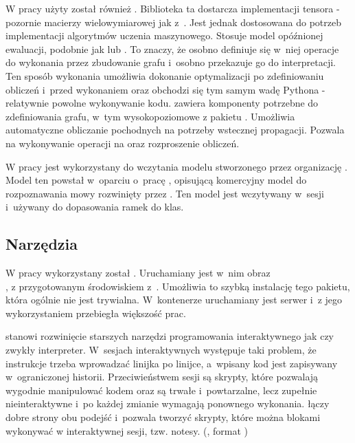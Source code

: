 W pracy użyty został również . Biblioteka ta dostarcza
implementacji tensora - pozornie macierzy wielowymiarowej jak z~. Jest jednak
dostosowana do potrzeb implementacji algorytmów uczenia maszynowego. Stosuje model opóźnionej
ewaluacji, podobnie jak  lub . To znaczy, że
osobno definiuje się w~niej operacje do wykonania przez zbudowanie grafu i~osobno przekazuje go do interpretacji.
Ten sposób wykonania umożliwia dokonanie optymalizacji po zdefiniowaniu obliczeń i~przed wykonaniem oraz
obchodzi się tym samym wadę Pythona - relatywnie powolne wykonywanie kodu.
 zawiera komponenty potrzebne do zdefiniowania grafu, w~tym wysokopoziomowe
z pakietu . Umożliwia automatyczne obliczanie pochodnych na potrzeby wstecznej propagacji.
Pozwala na wykonywanie operacji na  oraz rozproszenie obliczeń.

W pracy  jest wykorzystany do wczytania modelu stworzonego przez organizację .
Model ten powstał w~oparciu o~pracę \cite{deepSpeechScaling},
opisującą komercyjny model do rozpoznawania mowy rozwinięty przez .
Ten model jest wczytywany w~sesji  i~używany do dopasowania ramek do klas.

\subsection{Narzędzia}

W pracy wykorzystany został . Uruchamiany jest w~nim obraz \\ ,
z przygotowanym środowiskiem z~. Umożliwia to szybką instalację tego pakietu, która ogólnie nie
jest trywialna. W~kontenerze uruchamiany jest serwer  i~z jego wykorzystaniem przebiegła większość prac.

 stanowi rozwinięcie starszych narzędzi programowania interaktywnego jak  czy zwykły  interpreter. W~sesjach interaktywnych występuje taki problem, że instrukcje trzeba wprowadzać linijka po linijce, a~wpisany kod jest zapisywany w~ograniczonej historii. Przeciwieństwem sesji są skrypty, które pozwalają wygodnie manipulować
kodem oraz są trwałe i~powtarzalne, lecz zupełnie nieinteraktywne i~po każdej zmianie wymagają ponownego wykonania.
 łączy dobre strony obu podejść i~pozwala tworzyć skrypty, które można blokami wykonywać
w interaktywnej sesji, tzw. notesy. (, format )

